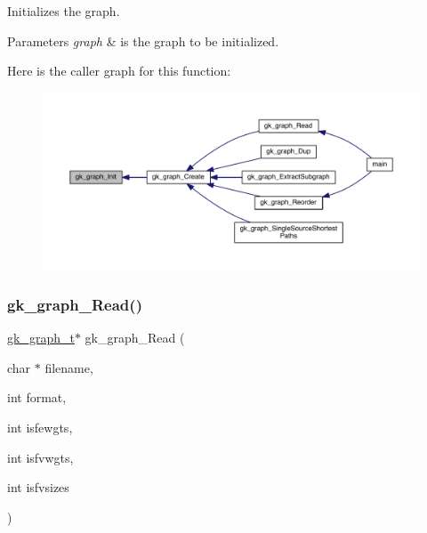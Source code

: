 Initializes the graph. 
\begin{DoxyParams}{Parameters}
{\em graph} & is the graph to be initialized. \\
\hline
\end{DoxyParams}
Here is the caller graph for this function\+:\nopagebreak
\begin{figure}[H]
\begin{center}
\leavevmode
\includegraphics[width=350pt]{a00077_ab017e0e6f2436f3ad24ea01d8b2c588c_icgraph}
\end{center}
\end{figure}
\mbox{\label{a00077_a432baae7f5c91c3604b42efb324b4131}} 
\subsubsection{\texorpdfstring{gk\+\_\+graph\+\_\+\+Read()}{gk\_graph\_Read()}}
{\footnotesize\ttfamily \hyperlink{a00638}{gk\+\_\+graph\+\_\+t}$\ast$ gk\+\_\+graph\+\_\+\+Read (\begin{DoxyParamCaption}\item[{char $\ast$}]{filename,  }\item[{int}]{format,  }\item[{int}]{isfewgts,  }\item[{int}]{isfvwgts,  }\item[{int}]{isfvsizes }\end{DoxyParamCaption})}

